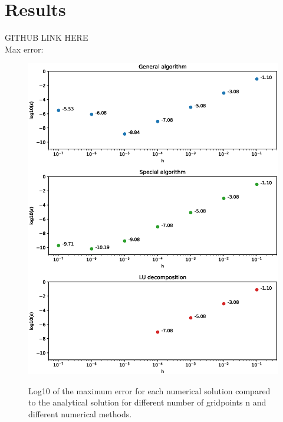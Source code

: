 \documentclass[american,a4paper,12pt]{article}
\begin{document}
\section{Results}
  GITHUB LINK HERE \\
  Max error:
  \begin{figure}[H]
  \begin{center}
    \includegraphics[width = \textwidth]{figures/max_err.eps} \\
    \caption{Log10 of the maximum error for each numerical solution compared to the analytical solution for different number of gridpoints n and different numerical methods.}
    \label{fig:max_err}
    \end{center}
  \end{figure}
\end{document}
